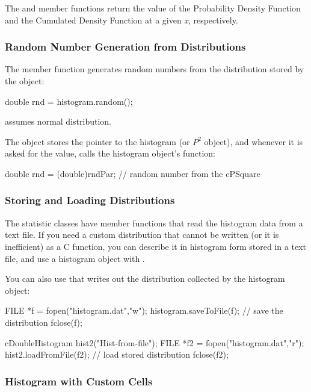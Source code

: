 The  and  member functions
return the value of the Probability Density Function and the Cumulated
Density Function at a given \textit{x}, respectively.


\subsubsection{Random Number Generation from Distributions}


The  member function generates random
numbers from the distribution stored by the
object:

\begin{cpp}
double rnd = histogram.random();
\end{cpp}


 assumes normal distribution.

The  object stores the pointer to the histogram (or $P^{2}$ object),
and whenever it is asked for the value, calls the histogram object's 
function:

\begin{cpp}
double rnd = (double)rndPar; // random number from the cPSquare
\end{cpp}

\subsubsection{Storing and Loading Distributions}


The statistic classes have  member functions
that read the histogram data from a text file. If you need a custom
distribution that cannot be written (or it
is inefficient) as a C function, you can describe it in histogram form
stored in a text file, and use a histogram object with
.

You can also use that writes out the distribution
collected by the histogram object:

\begin{cpp}
FILE *f = fopen("histogram.dat","w");
histogram.saveToFile(f); // save the distribution
fclose(f);

cDoubleHistogram hist2("Hist-from-file");
FILE *f2 = fopen("histogram.dat","r");
hist2.loadFromFile(f2); // load stored distribution
fclose(f2);
\end{cpp}


\subsubsection{Histogram with Custom Cells}


